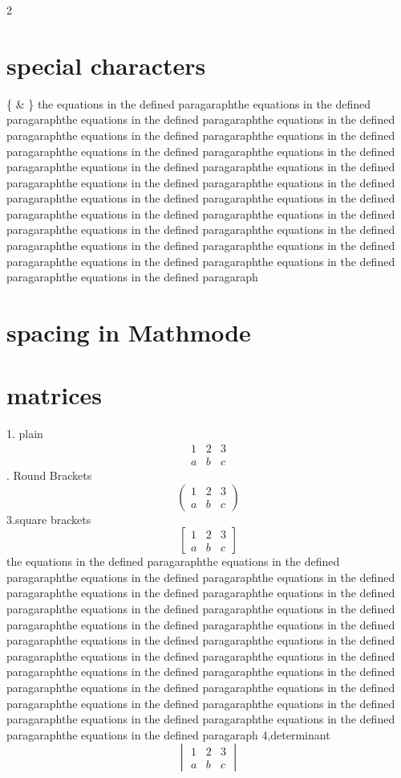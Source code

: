 \documentclass[12pt]{book}
\begin{document}
\begin {multicols}{2}
\section{special characters}
\{
\&
\}
the equations in the defined paragaraphthe equations in the defined paragaraphthe equations in the defined paragaraphthe equations in the defined paragaraphthe equations in the defined paragaraphthe equations in the defined paragaraphthe equations in the defined paragaraphthe equations in the defined paragaraphthe equations in the defined paragaraphthe equations in the defined paragaraphthe equations in the defined paragaraphthe equations in the defined paragaraphthe equations in the defined paragaraphthe equations in the defined paragaraphthe equations in the defined paragaraphthe equations in the defined paragaraphthe equations in the defined paragaraphthe equations in the defined paragaraphthe equations in the defined paragaraphthe equations in the defined paragaraphthe equations in the defined paragaraphthe equations in the defined paragaraphthe equations in the defined paragaraph
\section{spacing in Mathmode}
\section{matrices}
1. plain \\
$$
\begin{matrix}
1 & 2 & 3 \\
a & b & c 
\end{matrix} $$
. Round Brackets
$$ 
\begin{pmatrix}
1 & 2 & 3 \\
a & b & c 
\end{pmatrix} $$
3.square brackets
$$ 
\begin{bmatrix}
1 & 2 & 3 \\
a & b & c 
\end{bmatrix} $$
the equations in the defined paragaraphthe equations in the defined paragaraphthe equations in the defined paragaraphthe equations in the defined paragaraphthe equations in the defined paragaraphthe equations in the defined paragaraphthe equations in the defined paragaraphthe equations in the defined paragaraphthe equations in the defined paragaraphthe equations in the defined paragaraphthe equations in the defined paragaraphthe equations in the defined paragaraphthe equations in the defined paragaraphthe equations in the defined paragaraphthe equations in the defined paragaraphthe equations in the defined paragaraphthe equations in the defined paragaraphthe equations in the defined paragaraphthe equations in the defined paragaraphthe equations in the defined paragaraphthe equations in the defined paragaraphthe equations in the defined paragaraphthe equations in the defined paragaraph
4,determinant
$$ 
\begin{vmatrix}
1 & 2 & 3 \\
a & b & c 
\end{vmatrix} $$

\end{multicols}
\end{document}
